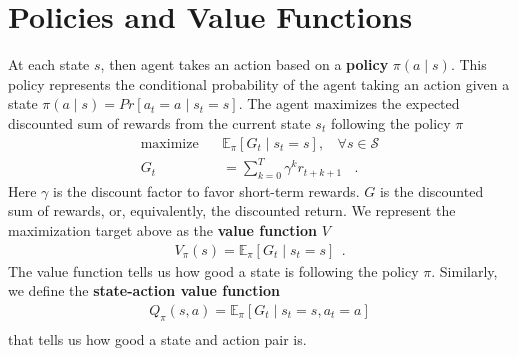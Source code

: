 \section{Policies and Value Functions} \label{sec:policies_and_functions}
At each state $s$, then agent takes an action based on a \textbf{policy} $\pi(a \mid s)$.
This policy represents the conditional probability of the agent taking an action given a state $\pi(a \mid s) = Pr[ a_{t} = a \mid  s_t = s]$.
The agent maximizes the expected discounted sum of rewards from the current state $s_t$ following the policy $\pi$
\begin{align*}
    \label{eq:maximize_reward_undiscounted}
    \text{maximize} ~~~~  & \mathbb{E}_{\pi}\left[ G_t \mid s_t = s \right] , ~~~~ \forall s \in \mathcal{S}  \\
    G_t                   & = \sum_{k=0}^{T} \gamma^{k} r_{t+k+1} ~~~~ .
\end{align*}
Here $\gamma$ is the discount factor to favor short-term rewards.
$G$ is the discounted sum of rewards, or, equivalently, the discounted return.
We represent the maximization target above as the \textbf{value function} $V$ 
\begin{align*}
    V_\pi(s) = \mathbb{E}_{\pi}\left[ G_t \mid s_t = s \right] ~~.
\end{align*}
The value function tells us how good a state is following the policy $\pi$.
Similarly, we define the \textbf{state-action value function}
\begin{align*}
    Q_\pi(s, a) = \mathbb{E}_{\pi}\left[ G_t \mid s_t = s, a_t = a \right]  \\
\end{align*}
that tells us how good a state and action pair is.




